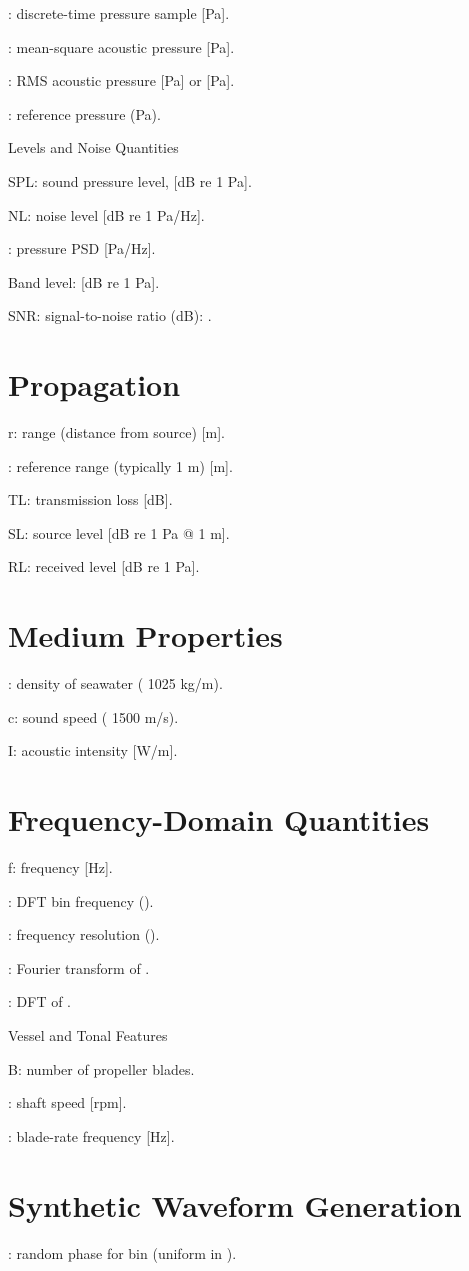 \documentclass[12pt]{article}
\begin{document}
: discrete-time pressure sample [Pa].

: mean-square acoustic pressure [Pa].

: RMS acoustic pressure [Pa] or [Pa].

: reference pressure (Pa).

Levels and Noise Quantities

SPL: sound pressure level,  [dB re 1 Pa].

NL: noise level [dB re 1 Pa/Hz].

: pressure PSD [Pa/Hz].

Band level:  [dB re 1 Pa].

SNR: signal-to-noise ratio (dB): .

\section*{Propagation}
r: range (distance from source) [m].

: reference range (typically 1 m) [m].

TL: transmission loss [dB].

SL: source level [dB re 1 Pa @ 1 m].

RL: received level [dB re 1 Pa].

\section*{Medium Properties}
: density of seawater ( 1025 kg/m).

c: sound speed ( 1500 m/s).

I: acoustic intensity [W/m].

\section*{Frequency-Domain Quantities}
f: frequency [Hz].

: DFT bin frequency ().

: frequency resolution ().

: Fourier transform of .

: DFT of .

Vessel and Tonal Features

B: number of propeller blades.

: shaft speed [rpm].

: blade-rate frequency [Hz].

\section*{Synthetic Waveform Generation}
: random phase for bin  (uniform in ).
\end{document}
